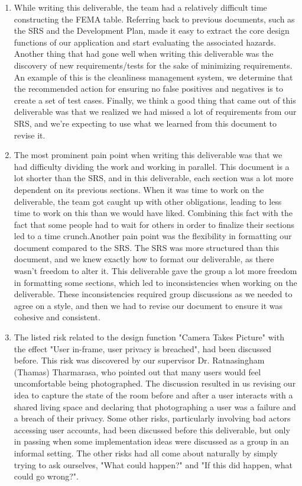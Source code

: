 \documentclass{article}
\begin{document}
\begin{enumerate}
    \item While writing this deliverable, the team had a relatively difficult time constructing the FEMA table. Referring back to previous documents, such as the SRS and the Development Plan, made it easy to extract the core design functions of our application and start evaluating the associated hazards. Another thing that had gone well when writing this deliverable was the discovery of new requirements/tests for the sake of minimizing requirements. An example of this is the cleanliness management system, we determine that the recommended action for ensuring no false positives and negatives is to create a set of test cases. Finally, we think a good thing that came out of this deliverable was that we realized we had missed a lot of requirements from our SRS, and we're expecting to use what we learned from this document to revise it.
    
    \item The most prominent pain point when writing this deliverable was that we had difficulty dividing the work and working in parallel. This document is a lot shorter than the SRS, and in this deliverable, each section was a lot more dependent on its previous sections. When it was time to work on the deliverable, the team got caught up with other obligations, leading to less time to work on this than we would have liked. Combining this fact with the fact that some people had to wait for others in order to finalize their sections led to a time crunch.\newline Another pain point was the flexibility in formatting our document compared to the SRS. The SRS was more structured than this document, and we knew exactly how to format our deliverable, as there wasn't freedom to alter it. This deliverable gave the group a lot more freedom in formatting some sections, which led to inconsistencies when working on the deliverable. These inconsistencies required group discussions as we needed to agree on a style, and then we had to revise our document to ensure it was cohesive and consistent. 
    
    \item The listed risk related to the design function "Camera Takes Picture" with the effect "User in-frame, user privacy is breached", had been discussed before. This risk was discovered by our supervisor Dr. Ratnasingham (Thamas) Tharmarasa, who pointed out that many users would feel uncomfortable being photographed. The discussion resulted in us revising our idea to capture the state of the room before and after a user interacts with a shared living space and declaring that photographing a user was a failure and a breach of their privacy. Some other risks, particularly involving bad actors accessing user accounts, had been discussed before this deliverable, but only in passing when some implementation ideas were discussed as a group in an informal setting. The other risks had all come about naturally by simply trying to ask ourselves, "What could happen?" and "If this did happen, what could go wrong?".
    

\end{enumerate}
\end{document}
